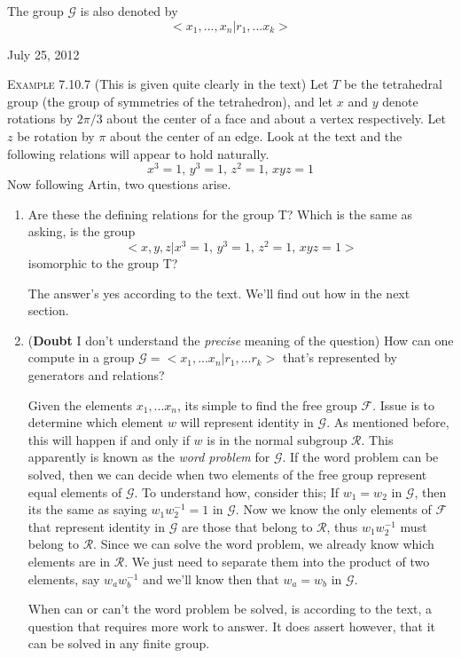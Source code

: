 \documentclass[12pt]{article}
\begin{document}
\par
The group $\mathcal G$ is also denoted by
\begin{equation*}
<x_{1},...,x_{n}|r_{1},...x_{k}>
\end{equation*}
\begin{flushright} {\small July 25, 2012} \end{flushright}
\textsc {Example 7.10.7} {\small (This is given quite clearly in the text) } Let $T$ be the tetrahedral group (the group of symmetries of the tetrahedron), and let $x$ and $y$ denote rotations by $2\pi /3$ about the center of a face and about a vertex respectively. Let $z$ be rotation by $\pi$ about the center of an edge. Look at the text and the following relations will appear to hold naturally.
\begin{equation*}
x^{3}=1,\,y^{3}=1,\,z^{2}=1,\,xyz=1
\end{equation*}
Now following Artin, two questions arise.
\begin{enumerate}
\item Are these the defining relations for the group T? Which is the same as asking, is the group
\begin{equation*}
<x,y,z|x^{3}=1,\,y^{3}=1,\,z^{2}=1,\,xyz=1>
\end{equation*}
isomorphic to the group T?
\par
The answer's yes according to the text. We'll find out how in the next section.
\item {\small ({\bf Doubt} I don't understand the \emph {precise} meaning of the question)} How can one compute in a group ${\mathcal G} = <x_{1},...x_{n} | r_{1},...r_{k}>$ that's represented by generators and relations?
\par
Given the elements $x_{1},...x_{n}$, its simple to find the free group $\mathcal F$. Issue is to determine which element $w$ will represent identity in $\mathcal G$. As mentioned before, this will happen if and only if $w$ is in the normal subgroup $\mathcal R$. This apparently is known as the \emph {word problem} for $\mathcal G$. If the word problem can be solved, then we can decide when two elements of the free group represent equal elements of $\mathcal G$. To understand how, consider this; If $w_{1}=w_{2}$ in $\mathcal G$, then its the same as saying $w_{1}w_{2}^{-1}=1$ in $\mathcal G$. Now we know the only elements of $\mathcal F$ that represent identity in $\mathcal G$ are those that belong to $\mathcal R$, thus $w_{1}w_{2}^{-1}$ must belong to $\mathcal R$. Since we can solve the word problem, we already know which elements are in $\mathcal R$. We just need to separate them into the product of two elements, say $w_{a}w_{b}^{-1}$ and we'll know then that $w_{a}=w_{b}$ in $\mathcal G$.
\par 
When can or can't the word problem be solved, is according to the text, a question that requires more work to answer. It does assert however, that it can be solved in any finite group.
\end{enumerate}
\end{document}
